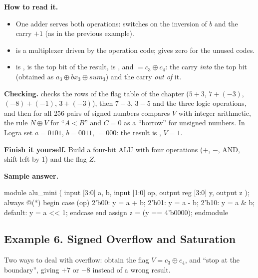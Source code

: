 \textbf{How to read it.}
\begin{itemize}
  \item One adder serves both operations:  switches on the inversion of $b$ and the carry $+1$ (as in the previous example).
  \item {} is a multiplexer driven by the operation code;  gives zero for the unused codes.
  \item {} is ,  is the top bit of the result,  is , and  $=c_3\oplus c_4$: the carry \emph{into} the top bit (obtained as $a_3\oplus bx_3\oplus sum_3$) and the carry \emph{out of} it.
\end{itemize}
\textbf{Checking.}  checks the rows of the flag table of the
chapter ($5+3$, $7+(-3)$, $(-8)+(-1)$, $3+(-3)$), then $7-3$, $3-5$ and the
three logic operations, and then for all 256 pairs of signed numbers compares
$V$ with integer arithmetic, the rule $N\oplus V$ for ``$A<B$'' and $C=0$ as a
``borrow'' for unsigned numbers. In Logra set $a=0101$, $b=0011$, 
$=000$: the result is , $V=1$.

\textbf{Finish it yourself.} Build a four-bit ALU with four operations ($+$,
$-$, AND, shift left by 1) and the flag $Z$.

\textbf{Sample answer.}
\begin{vcode}
module alu_mini (
    input  [3:0] a, b,
    input  [1:0] op,
    output reg [3:0] y,
    output       z
);
    always @(*) begin
        case (op)
            2'b00:   y = a + b;
            2'b01:   y = a - b;
            2'b10:   y = a & b;
            default: y = a << 1;
        endcase
    end
    assign z = (y == 4'b0000);
endmodule
\end{vcode}

\subsection{Example 6. Signed Overflow and Saturation}

Two ways to deal with overflow: obtain the flag $V=c_3\oplus c_4$, and
``stop at the boundary'', giving $+7$ or $-8$ instead of a wrong result.


